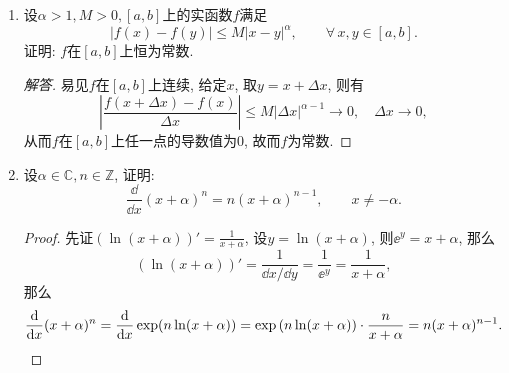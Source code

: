 \begin{3a}
\begin{enumerate}
\begin{proof}[解答]
(i) \(x=\pm 2\)为\(g(x)\)的极值点, 代入\(a=g(x)\), 可知
\[a=\frac{36-16-12}{\pm 2}=\pm 4.\]
于是\(a=4\)时, \(x=2\)为\(f(x)=0\)的重根, \(a=-4\)时, \(x=-2\)为\(f(x)=0\)的重根.

(ii) $x=\pm{\rm i}$，代入$a=g(x)$得
\[a=\frac{-9-1-12}{\pm {\rm i}}=\pm 22{\rm i}.\qedhere\]
\end{proof}
\item 设\(\alpha>1,M>0,[a,b]\)上的实函数\(f\)满足
\[|f(x)-f(y)|\leqslant M|x-y|^\alpha,\qquad\forall\, x,y\in[a,b].\]
证明: \(f\)在\([a,b]\)上恒为常数.
\begin{proof}[解答]
易见\(f\)在\([a,b]\)上连续, 给定\(x\), 取\(y=x+\Delta x\), 则有
\[\left|\frac{f(x+\Delta x)-f(x)}{\Delta x}\right|
\leqslant M\left|\Delta x\right|^{\alpha-1}\rightarrow 0,\quad\Delta x\rightarrow 0,\]
从而\(f\)在\([a,b]\)上任一点的导数值为\(0\), 故而\(f\)为常数.
\end{proof}
\item 设\(\alpha\in\mathbb{C},n\in\mathbb{Z}\), 证明:
\[\frac{\dd}{\dd x}(x+\alpha)^n=n(x+\alpha)^{n-1},\qquad x\ne -\alpha.\]
\begin{proof}
先证\(\left(\ln(x+\alpha)\right)'=\frac{1}{x+\alpha}\), 
设\(y=\ln(x+\alpha)\), 则\(\ee^y=x+\alpha\), 那么
\[\left(\ln(x+\alpha)\right)'=\frac{1}{\dd x/\dd y}=\frac{1}{\ee^y}=\frac{1}{x+\alpha},\]
那么\[\frac{\mathrm{d}}{\mathrm{d} x}(x+\alpha)^n=\frac{\mathrm{d}}{\mathrm{d} x}\exp(n\ln(x+\alpha))
=\exp\left(n\ln(x+\alpha)\right)\cdot\frac{n}{x+\alpha}=n(x+\alpha)^{n-1}.\qedhere\]
\end{proof}
\end{enumerate}
\end{3a}

